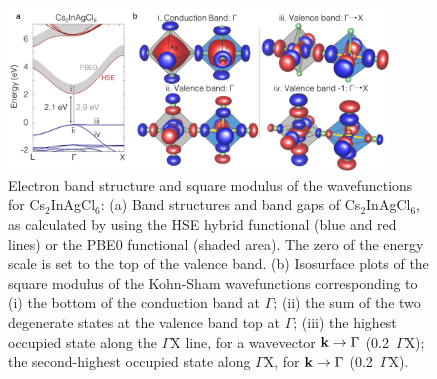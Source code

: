 \documentclass[journal=jpcl,manuscript=letter,layout=traditional]{achemso}
\begin{document}
\begin{figure}[ht!]
\begin{center}
\includegraphics[width=0.9\textwidth]{figure2.png}
\end{center}
\caption{\label{fig:2}
  Electron band structure and square modulus of the wavefunctions for Cs$_2$InAgCl$_6$: (a) Band
  structures and band gaps of Cs$_2$InAgCl$_6$, as calculated by using the HSE hybrid functional
  (blue and red lines) or the PBE0 functional (shaded area). The zero of the energy scale is set to the top of
  the valence band. (b) Isosurface plots of the square modulus of the Kohn-Sham  wavefunctions corresponding to (i)
  the bottom of the conduction band at $\Gamma$; (ii) the sum of the two degenerate states at the valence band top
  at $\Gamma$; (iii) the highest occupied state along the $\Gamma$X line, for a wavevector ${\bf k}\rightarrow\Gamma$
  (0.2~$\Gamma$X); the second-highest occupied state along $\Gamma$X, for ${\bf k}\rightarrow\Gamma$ (0.2~$\Gamma$X).
  }
\end{figure}
\newpage
\end{document}
